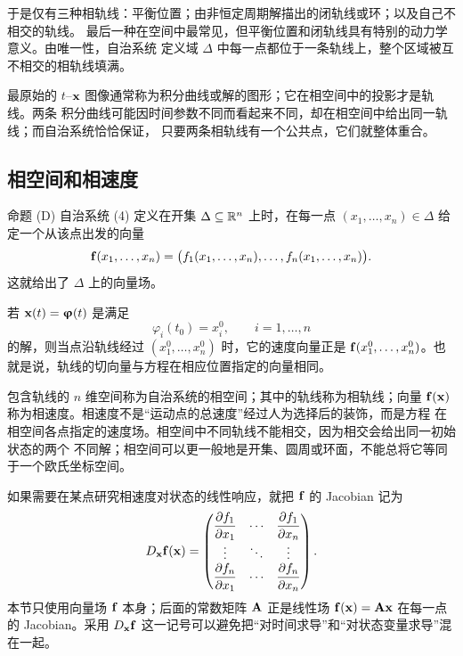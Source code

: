 于是仅有三种相轨线：平衡位置；由非恒定周期解描出的闭轨线或环；以及自己不相交的轨线。
最后一种在空间中最常见，但平衡位置和闭轨线具有特别的动力学意义。由唯一性，自治系统
定义域 \(\Delta\) 中每一点都位于一条轨线上，整个区域被互不相交的相轨线填满。

最原始的 \(t\)–\(\vect{x}\) 图像通常称为积分曲线或解的图形；它在相空间中的投影才是轨线。两条
积分曲线可能因时间参数不同而看起来不同，却在相空间中给出同一轨线；而自治系统恰恰保证，
只要两条相轨线有一个公共点，它们就整体重合。

\subsection*{相空间和相速度}

\begin{sourceitem}{命题 (D)}
自治系统 (4) 定义在开集 \(\Delta\subseteq\mathbb R^n\) 上时，在每一点
\((x_1,\ldots,x_n)\in\Delta\) 给定一个从该点出发的向量
\[
 \vect{f}(x_1,\ldots,x_n)
 =\bigl(f_1(x_1,\ldots,x_n),\ldots,f_n(x_1,\ldots,x_n)\bigr).
\]
这就给出了 \(\Delta\) 上的向量场。
\end{sourceitem}

若 \(\vect{x}(t)=\vect{\varphi}(t)\) 是满足
\[
 \varphi_i(t_0)=x_i^0,\qquad i=1,\ldots,n
\]
的解，则当点沿轨线经过 \((x_1^0,\ldots,x_n^0)\) 时，它的速度向量正是
\(\vect{f}(x_1^0,\ldots,x_n^0)\)。也就是说，轨线的切向量与方程在相应位置指定的向量相同。

包含轨线的 \(n\) 维空间称为自治系统的相空间；其中的轨线称为相轨线；向量
\(\vect{f}(\vect{x})\) 称为相速度。相速度不是“运动点的总速度”经过人为选择后的装饰，而是方程
在相空间各点指定的速度场。相空间中不同轨线不能相交，因为相交会给出同一初始状态的两个
不同解；相空间可以更一般地是开集、圆周或环面，不能总将它等同于一个欧氏坐标空间。

如果需要在某点研究相速度对状态的线性响应，就把 \(\vect{f}\) 的 Jacobian 记为
\[
 D_{\vect{x}}\vect{f}(\vect{x})=
 \begin{pmatrix}
  \dfrac{\partial f_1}{\partial x_1}&\cdots&
  \dfrac{\partial f_1}{\partial x_n}\\
  \vdots&\ddots&\vdots\\
  \dfrac{\partial f_n}{\partial x_1}&\cdots&
  \dfrac{\partial f_n}{\partial x_n}
 \end{pmatrix}.
\]
本节只使用向量场 \(\vect{f}\) 本身；后面的常数矩阵 \(\mathbf{A}\) 正是线性场 \(\vect{f}(\vect{x})=\mat{A}\vect{x}\) 在每一点的
Jacobian。采用 \(D_{\vect{x}}\vect{f}\) 这一记号可以避免把“对时间求导”和“对状态变量求导”混在一起。

